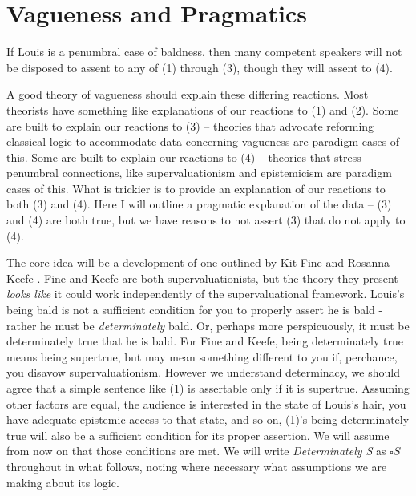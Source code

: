 
%
%
%
%
%
%
%
%
%
%
\chapter{Vagueness and Pragmatics}


If Louis is a penumbral case of baldness, then many competent speakers will not be disposed to assent to any of (1) through (3), though they will assent to (4).


\noindent A good theory of vagueness should explain these differing reactions. Most theorists have something like explanations of our reactions to (1) and (2). Some are built to explain our reactions to (3) -- theories that advocate reforming classical logic to accommodate data concerning vagueness are paradigm cases of this. Some are built to explain our reactions to (4) -- theories that stress penumbral connections, like supervaluationism and epistemicism are paradigm cases of this. What is trickier is to provide an explanation of our reactions to both (3) and (4). Here I will outline a pragmatic explanation of the data -- (3) and (4) are both true, but we have reasons to not assert (3) that do not apply to (4).

The core idea will be a development of one outlined by Kit Fine \citeyearpar[140]{Fine1975a} and Rosanna Keefe \citeyearpar[164]{Keefe2000}. Fine and Keefe are both supervaluationists, but the theory they present \textit{looks like} it could work independently of the supervaluational framework. Louis's being bald is not a sufficient condition for you to properly assert he is bald - rather he must be \textit{determinately} bald. Or, perhaps more perspicuously, it must be determinately true that he is bald. For Fine and Keefe, being determinately true means being supertrue, but may mean something different to you if, perchance, you disavow supervaluationism. However we understand determinacy, we should agree that a simple sentence like (1) is assertable only if it is supertrue. Assuming other factors are equal, the audience is interested in the state of Louis's hair, you have adequate epistemic access to that state, and so on, (1)'s being determinately true will also be a sufficient condition for its proper assertion. We will assume from now on that those conditions are met. We will write \textit{Determinately S} as \(\square S\) throughout in what follows, noting where necessary what assumptions we are making about its logic. 

